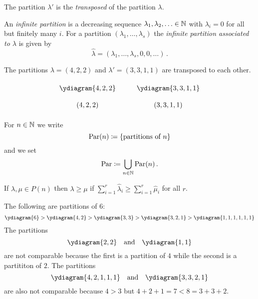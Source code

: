 \begin{definition}
  The partition $\lambda'$ is the \emph{transposed} of the partition $\lambda$.
\end{definition}


\begin{definition}
  An \emph{infinite partition} is a decreasing sequence $\lambda_1, \lambda_2, \dotsc \in \mathbb{N}$ with $\lambda_i = 0$ for all but finitely many $i$.
  For a partition $(\lambda_1, \dotsc, \lambda_s)$ the \emph{infinite partition associated to $\lambda$} is given by
  \[
      \hat{\lambda}
    = (\lambda_1, \dotsc, \lambda_s, 0, 0, \dotsc) \,.
  \]
\end{definition}


\begin{example}
  The partitions $\lambda = (4,2,2)$ and $\lambda' = (3,3,1,1)$ are transposed to each other.
  \[
    \renewcommand{\arraystretch}{2}
    \begin{matrix}
        \ydiagram{4,2,2}
      & \quad
      & \ydiagram{3,3,1,1}
      \\
        (4,2,2)
      & {}
      & (3,3,1,1)
    \end{matrix}
  \]
\end{example}


\begin{definition}
  For $n \in \mathbb{N}$ we write
  \[
              \operatorname{Par}(n)
    \coloneqq \{\text{partitions of $n$}\}
  \]
  and we set
  \[
              \operatorname{Par}
    \coloneqq \bigcup_{n \in \mathbb{N}} \operatorname{Par}(n) \,.
  \]
\end{definition}


\begin{definition}
  If $\lambda, \mu \in P(n)$ then $\lambda \geq \mu$ if $\sum_{i=1}^r \hat{\lambda}_i \geq \sum_{i=1}^r \hat{\mu}_i$ for all $r$.
\end{definition}


\begin{example}
  The following are partitions of $6$:
  \[
      \ydiagram{6}
    > \ydiagram{4,2}
    > \ydiagram{3,3}
    > \ydiagram{3,2,1}
    > \ydiagram{1,1,1,1,1,1}
  \]
  The partitions
  \[
    \ydiagram{2,2}
    \quad\text{and}\quad
    \ydiagram{1,1}
  \]
  are not comparable because the first is a partition of $4$ while the second is a partititon of $2$.
  The partitions
  \[
    \ydiagram{4,2,1,1,1}
    \quad \text{and} \quad
    \ydiagram{3,3,2,1}
  \]
  are also not comparable because $4 > 3$ but $4+2+1 = 7 < 8 = 3+3+2$.
\end{example}


